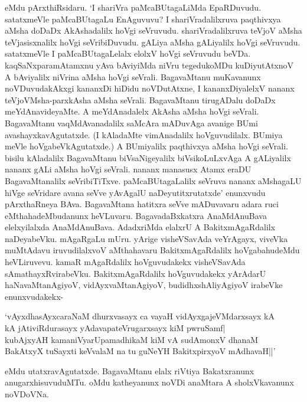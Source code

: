 eMdu pArxthiRsidaru. `I shariVra paMcaBUtagaLiMda EpaRDuvudu. satatxmeVle paMcaBUtagaLu EnAguvuvu? I shariVradalilxruva paqthivxya aMsha doDaDx AkAshadalilx hoVgi seVruvudu. shariVradalilxruva teVjoV aMsha teVjasisxnalilx hoVgi seVribiDuvudu. gALiya aMsha gALiyalilx hoVgi seVruvudu. satatxmeVle I paMcaBUtagaLelalx elolxV hoVgi seVruvudu beVDa. kaqSaNxparamAtamxnu yAva bAviyiMda niVru tegedukoMDu kuDiyutAtxnoV A bAviyalilx niVrina aMsha hoVgi seVrali. BagavaMtanu muKavanunx noVDuvudakAkxgi kananxDi hiDidu noVDutAtxne, I kananxDiyalelxV nananx teVjoVMsha-parxkAsha aMsha seVrali. BagavaMtanu tirugADalu doDaDx meYdAnavideyaMte. A meYdAnadalelx AkAsha aMsha hoVgi seVrali. BagavaMtanu vaqMdAvanadalilx saMcAra mADuvAga avanige BUmi avashayxkavAgutatxde. (I kAladaMte vimAnadalilx hoVguvudilalx. BUmiya meVle hoVgabeVkAgutatxde.) A BUmiyalilx paqthivxya aMsha hoVgi seVrali. bisilu kAladalilx BagavaMtanu biVsaNigeyalilx biVsikoLuLxvAga A gALiyalilx nananx gALi aMsha hoVgi seVrali. nananx manasusx Atamx eraDU BagavaMtanalilx seVribiTiTxve. paMcaBUtagaLalilx seVruva nananx aMshagaLU hiVge seVridare avana seVve yAvAgalU naDeyutitxrutatxde' enunxvudu pArxthaRneya BAva. BagavaMtana hatitxra seVve mADuvavaru adara ruci eMthahadeMbudanunx heVLuvaru. BagavadaBxkatxra AnaMdAnuBava elelxyilalxda AnaMdAnuBava. AdadxriMda elalxrU A BakitxmAgaRdalilx naDeyabeVku. mAgaRgaLu mUru. yArige visheVSavAda veYrAgayx, viveVka muMtAdavu iruvudilalxvoV aMthahavaru BakitxmAgaRdalilx hoVgabahudeMdu heVLiruvevu. kamaR mAgaRdalilx hoVguvudakekx visheVSavAda sAmathayxRvirabeVku. BakitxmAgaRdalilx hoVguvudakekx yArAdarU haNavaMtanAgiyoV, vidAyxvaMtanAgiyoV, budidhxshAliyAgiyoV irabeVke enunxvudakekx-

\begin{shloka}
`vAyxdhasAyxcaraNaM dhurxvasayx ca vayaH vidAyxgajeVMdarxsayx kA\\
kA jAtiviRdurasayx yAdavapateVrugarxsayx kiM pwruSamf|\\
kubAjxyAH kamaniVyarUpamadhikaM kiM vA sudAmonxV dhanaM\\
BakAtxyX tuSayxti keVvalaM na tu guNeYH BakitxpirxyoV mAdhavaH||'
\end{shloka}

eMdu utatxravAgutatxde. BagavaMtanu elalx riVtiya Bakatxranunx anugarxhisuvuduMTu. oMdu katheyanunx noVDi anaMtara A sholxVkavanunx noVDoVNa.

